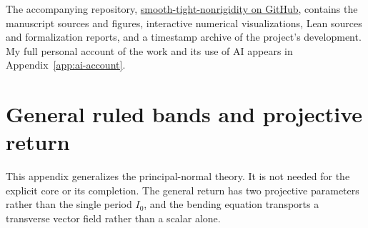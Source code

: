 \documentclass[11pt]{amsart}
\theoremstyle{definition}
\theoremstyle{remark}
\numberwithin{equation}{section}
\begin{document}
The accompanying repository,
\href{https://github.com/zhangyuetong/smooth-tight-nonrigidity}{smooth-tight-nonrigidity on GitHub},
contains the manuscript sources and figures, interactive numerical
visualizations, Lean sources and formalization reports, and a timestamp
archive of the project's development. My full personal account of the
work and its use of AI appears in Appendix~\ref{app:ai-account}.

\appendix
\section{General ruled bands and projective return}\label{sec:general-ruled}
This appendix generalizes the principal-normal theory. It is not needed
for the explicit core or its completion. The general return has two
projective parameters rather than the single period $I_0$, and the bending
equation transports a transverse vector field rather than a scalar alone.
\end{document}
